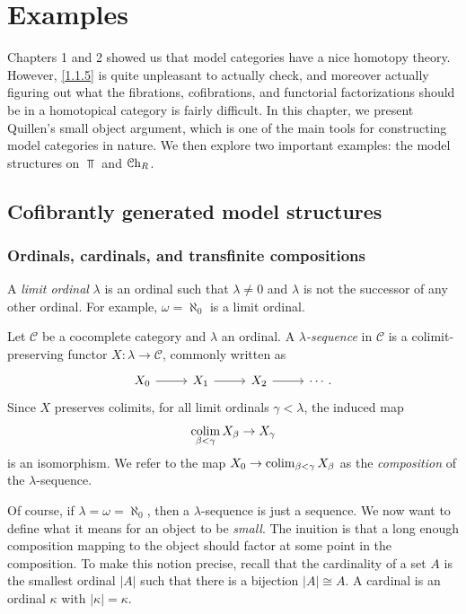 \chapter{Examples}

Chapters 1 and 2 showed us that model categories have a nice homotopy theory. However, \cref{1.1.5} is quite unpleasant to actually check, and moreover actually figuring out what the fibrations, cofibrations, and functorial factorizations should be in a homotopical category is fairly difficult. In this chapter, we present Quillen's small object argument, which is one of the main tools for constructing model categories in nature. We then explore two important examples: the model structures on $\Top $ and $\mathcal{C}\mathrm{h}_{R} $.

\section{Cofibrantly generated model structures}

\subsection{Ordinals, cardinals, and transfinite compositions}

A \emph{limit ordinal} $\lambda $ is an ordinal such that $\lambda \neq 0$ and $\lambda $ is not the successor of any other ordinal. For example, $\omega =\aleph_0$ is a limit ordinal.

\begin{definition}\label{3.1.1}
	Let $\mathcal{C} $ be a cocomplete category and $\lambda $ an ordinal. A \emph{$\lambda $-sequence} in $\mathcal{C} $ is a colimit-preserving functor $X : \lambda  \to \mathcal{C} $, commonly written as
	\[\begin{tikzcd}[row sep = 2.5em, column sep = 2.5em]
	X_0\ar[r]  & X_1\ar[r]  & X_2\ar[r]  & \cdots .
	\end{tikzcd}\]
	Since $X$ preserves colimits, for all limit ordinals $\gamma <\lambda $, the induced map
	\[
		\operatorname*{colim}_{\beta <\gamma } X_\beta \to X_\gamma 
	\]
	is an isomorphism. We refer to the map $X_0 \to \operatorname*{colim}_{\beta <\gamma } X_\beta $ as the \emph{composition} of the $\lambda $-sequence.
\end{definition}

Of course, if $\lambda =\omega =\aleph_0$, then a $\lambda $-sequence is just a sequence. We now want to define what it means for an object to be \emph{small}. The inuition is that a long enough composition mapping to the object should factor at some point in the composition. To make this notion precise, recall that the cardinality of a set $A$ is the smallest ordinal $\left| A \right| $ such that there is a bijection $\left| A \right| \cong A$. A cardinal is an ordinal $\kappa $ with $\left| \kappa  \right| =\kappa $.

